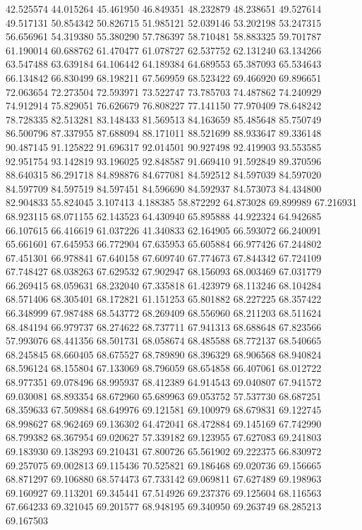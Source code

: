 42.525574
44.015264
45.461950
46.849351
48.232879
48.238651
49.527614
49.517131
50.854342
50.826715
51.985121
52.039146
53.202198
53.247315
56.656961
54.319380
55.380290
57.786397
58.710481
58.883325
59.701787
61.190014
60.688762
61.470477
61.078727
62.537752
62.131240
63.134266
63.547488
63.639184
64.106442
64.189384
64.689553
65.387093
65.534643
66.134842
66.830499
68.198211
67.569959
68.523422
69.466920
69.896651
72.063654
72.273504
72.593971
73.522747
73.785703
74.487862
74.240929
74.912914
75.829051
76.626679
76.808227
77.141150
77.970409
78.648242
78.728335
82.513281
83.148433
81.569513
84.163659
85.485648
85.750749
86.500796
87.337955
87.688094
88.171011
88.521699
88.933647
89.336148
90.487145
91.125822
91.696317
92.014501
90.927498
92.419903
93.553585
92.951754
93.142819
93.196025
92.848587
91.669410
91.592849
89.370596
88.640315
86.291718
84.898876
84.677081
84.592512
84.597039
84.597020
84.597709
84.597519
84.597451
84.596690
84.592937
84.573073
84.434800
82.904833
55.824045
3.107413
4.188385
58.872292
64.873028
69.899989
67.216931
68.923115
68.071155
62.143523
64.430940
65.895888
44.922324
64.942685
66.107615
66.416619
61.037226
41.340833
62.164905
66.593072
66.240091
65.661601
67.645953
66.772904
67.635953
65.605884
66.977426
67.244802
67.451301
66.978841
67.640158
67.609740
67.774673
67.844342
67.724109
67.748427
68.038263
67.629532
67.902947
68.156093
68.003469
67.031779
66.269415
68.059631
68.232040
67.335818
61.423979
68.113246
68.104284
68.571406
68.305401
68.172821
61.151253
65.801882
68.227225
68.357422
66.348999
67.987488
68.543772
68.269409
68.556960
68.211203
68.511624
68.484194
66.979737
68.274622
68.737711
67.941313
68.688648
67.823566
57.993076
68.441356
68.501731
68.058674
68.485588
68.772137
68.540665
68.245845
68.660405
68.675527
68.789890
68.396329
68.906568
68.940824
68.596124
68.155804
67.133069
68.796059
68.654858
66.407061
68.012722
68.977351
69.078496
68.995937
68.412389
64.914543
69.040807
67.941572
69.030081
68.893354
68.672960
65.689963
69.053752
57.537730
68.687251
68.359633
67.509884
68.649976
69.121581
69.100979
68.679831
69.122745
68.998627
68.962469
69.136302
64.472041
68.472884
69.145169
67.742990
68.799382
68.367954
69.020627
57.339182
69.123955
67.627083
69.241803
69.183930
69.138293
69.210431
67.800726
65.561902
69.222375
66.830972
69.257075
69.002813
69.115436
70.525821
69.186468
69.020736
69.156665
68.871297
69.106880
68.574473
67.733142
69.069811
67.627489
69.198963
69.160927
69.113201
69.345441
67.514926
69.237376
69.125604
68.116563
67.664233
69.321045
69.201577
68.948195
69.340950
69.263749
68.285213
69.167503
